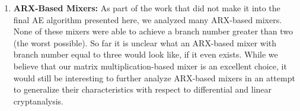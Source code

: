 \begin{enumerate}
\item \textbf{ARX-Based Mixers:}
As part of the work that did not make it into the final AE algorithm presented here, we analyzed many ARX-based mixers.
None of these mixers were able to achieve a branch number greater than two (the worst possible).
So far it is unclear what an ARX-based mixer with branch number equal to three would look like, if it even exists.
While we believe that our matrix multiplication-based mixer is an excellent choice, it would still be interesting to further analyze ARX-based mixers in an attempt to generalize their characteristics with respect to differential and linear cryptanalysis.

\end{enumerate}

